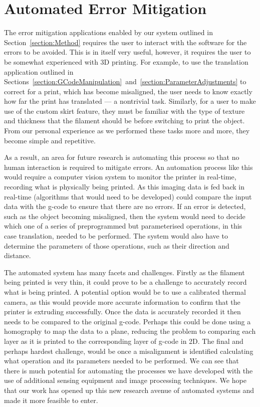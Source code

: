 \documentclass[11pt]{report} %
\begin{document}
\section{Automated Error Mitigation}
The error mitigation applications enabled by our system outlined in Section~\ref{section:Method} requires the user to interact with the software for the errors to be avoided. This is in itself very useful, however, it requires the user to be somewhat experienced with 3D printing. For example, to use the translation application outlined in Sections~\ref{section:GCodeManipulation}~and~\ref{section:ParameterAdjustments} to correct for a print, which has become misaligned, the user needs to know exactly how far the print has translated --- a nontrivial task. Similarly, for a user to make use of the custom skirt feature, they must be familiar with the type of texture and thickness that the filament should be before switching to print the object. From our personal experience as we performed these tasks more and more, they become simple and repetitive. 

As a result, an area for future research is automating this process so that no human interaction is required to mitigate errors. An automation process like this would require a computer vision system to monitor the printer in real-time, recording what is physically being printed. As this imaging data is fed back in real-time (algorithms that would need to be developed) could compare the input data with the g-code to ensure that there are no errors. If an error is detected, such as the object becoming misaligned, then the system would need to decide which one of a series of preprogrammed but parameterised operations, in this case translation, needed to be performed. The system would also have to determine the parameters of those operations, such as their direction and distance. 

The automated system has many facets and challenges. Firstly as the filament being printed is very thin, it could prove to be a challenge to accurately record what is being printed. A potential option would be to use a calibrated thermal camera, as this would provide more accurate information to confirm that the printer is extruding successfully. Once the data is accurately recorded it then needs to be compared to the original g-code. Perhaps this could be done using a homography to map the data to a plane, reducing the problem to comparing each layer as it is printed to the corresponding layer of g-code in 2D. The final and perhaps hardest challenge, would be once a misalignment is identified calculating what operation and its parameters needed to be performed. We can see that there is much potential for automating the processes we have developed with the use of additional sensing equipment and image processing techniques. We hope that our work has opened up this new research avenue of automated systems and made it more feasible to enter.
\end{document}
